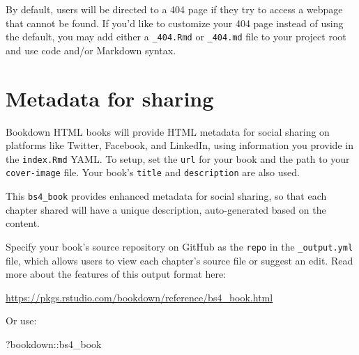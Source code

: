 \documentclass[
]{book}
\newenvironment{Shaded}{\begin{snugshade}}{\end{snugshade}}
\newcommand{\NormalTok}[1]{#1}
\newcommand{\SpecialCharTok}[1]{\textcolor[rgb]{0.00,0.00,0.00}{#1}}
\theoremstyle{definition}
\theoremstyle{definition}
\theoremstyle{definition}
\theoremstyle{definition}
\theoremstyle{remark}
\begin{document}
By default, users will be directed to a 404 page if they try to access a webpage that cannot be found. If you'd like to customize your 404 page instead of using the default, you may add either a \texttt{\_404.Rmd} or \texttt{\_404.md} file to your project root and use code and/or Markdown syntax.

\hypertarget{metadata-for-sharing}{%
\section{Metadata for sharing}\label{metadata-for-sharing}}

Bookdown HTML books will provide HTML metadata for social sharing on platforms like Twitter, Facebook, and LinkedIn, using information you provide in the \texttt{index.Rmd} YAML. To setup, set the \texttt{url} for your book and the path to your \texttt{cover-image} file. Your book's \texttt{title} and \texttt{description} are also used.

This \texttt{bs4\_book} provides enhanced metadata for social sharing, so that each chapter shared will have a unique description, auto-generated based on the content.

Specify your book's source repository on GitHub as the \texttt{repo} in the \texttt{\_output.yml} file, which allows users to view each chapter's source file or suggest an edit. Read more about the features of this output format here:

\url{https://pkgs.rstudio.com/bookdown/reference/bs4_book.html}

Or use:

\begin{Shaded}
\begin{Highlighting}[]
\NormalTok{?bookdown}\SpecialCharTok{::}\NormalTok{bs4\_book}
\end{Highlighting}
\end{Shaded}


  
\end{document}
